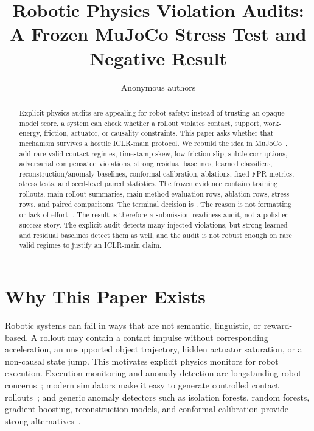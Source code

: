 \documentclass{article}
\title{Robotic Physics Violation Audits:\\A Frozen MuJoCo Stress Test and Negative Result}
\author{Anonymous authors}
\begin{document}
\maketitle

\begin{abstract}
Explicit physics audits are appealing for robot safety: instead of trusting an opaque model score, a system can check whether a rollout violates contact, support, work-energy, friction, actuator, or causality constraints. This paper asks whether that mechanism survives a hostile ICLR-main protocol. We rebuild the idea in MuJoCo~\citep{todorov2012mujoco}, add rare valid contact regimes, timestamp skew, low-friction slip, subtle corruptions, adversarial compensated violations, strong residual baselines, learned classifiers, reconstruction/anomaly baselines, conformal calibration, ablations, fixed-FPR metrics, stress tests, and seed-level paired statistics. The frozen evidence contains \TrainingRows{} training rollouts, \RolloutRows{} main rollout summaries, \MainRows{} main method-evaluation rows, \AblationRows{} ablation rows, \StressRows{} stress rows, and \PairwiseRows{} paired comparisons. The terminal decision is \textbf{\PaperDecision}. The reason is not formatting or lack of effort: \PaperDecisionReason. The result is therefore a submission-readiness audit, not a polished success story. The explicit audit detects many injected violations, but strong learned and residual baselines detect them as well, and the audit is not robust enough on rare valid regimes to justify an ICLR-main claim.
\end{abstract}

\section{Why This Paper Exists}

Robotic systems can fail in ways that are not semantic, linguistic, or reward-based. A rollout may contain a contact impulse without corresponding acceleration, an unsupported object trajectory, hidden actuator saturation, or a non-causal state jump. This motivates explicit physics monitors for robot execution. Execution monitoring and anomaly detection are longstanding robot concerns~\citep{park2016multimodal,park2018multimodal}; modern simulators make it easy to generate controlled contact rollouts~\citep{todorov2012mujoco}; and generic anomaly detectors such as isolation forests, random forests, gradient boosting, reconstruction models, and conformal calibration provide strong alternatives~\citep{liu2008isolation,breiman2001random,freund1997decision,scholkopf2001support,angelopoulos2021gentle,vovk2005algorithmic}.
\end{document}

